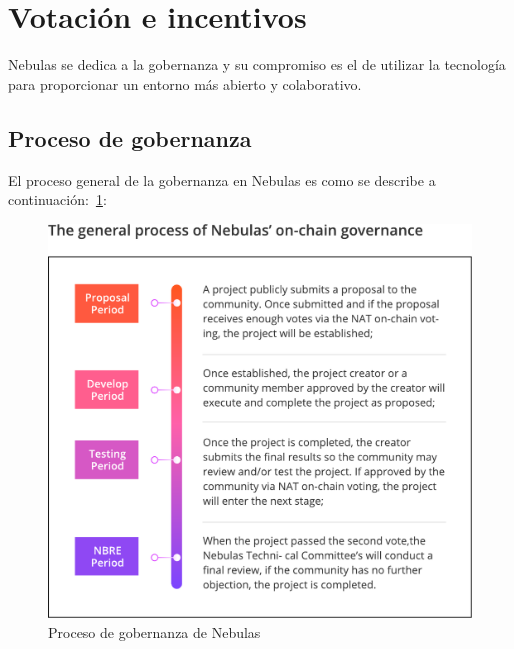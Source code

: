 \section{Votación \onchain e incentivos}

Nebulas se dedica a la gobernanza \onchain y su compromiso es el de utilizar la tecnología \blockchain para proporcionar un entorno más abierto y colaborativo.

\subsection{Proceso de gobernanza \onchain}
\label{governance}

El proceso general de la gobernanza \onchain en Nebulas es como se describe a continuación:~\ref{fig:on-chain-governance}:

\begin{figure}
	\centering
	\includegraphics[width=1\textwidth]{../common/en/on-chain-governance.pdf}
	\caption{Proceso de gobernanza \onchain de Nebulas \label{fig:on-chain-governance}}
\end{figure}

